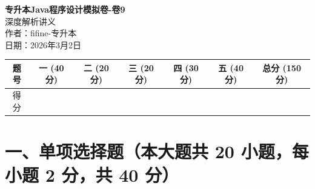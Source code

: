\documentclass[12pt, a4paper]{ctexart}
\begin{document}
\thispagestyle{empty}
\newpage

\begin{center}
	{\huge\bfseries\color{myblue} 专升本Java程序设计模拟卷-卷9}\\[1em]
	{\large 深度解析讲义}\\[1em]
	{\large 作者：fifine-专升本}\\[1em]
	{\large 日期：2026年3月2日}\\[1em]
	\vspace{1em}
	\begin{tabular}{|c|c|c|c|c|c|c|}
		\hline
		题号 & 一 (40 分)       & 二 (20 分)       & 三 (20 分)       & 四 (30 分)       & 五 (40 分)       & 总分 (150 分)     \\
		\hline
		得分 & \hspace{1.5cm} & \hspace{1.5cm} & \hspace{1.5cm} & \hspace{1.5cm} & \hspace{1.5cm} & \hspace{1.5cm} \\
		\hline
	\end{tabular}
	\vspace{2em}
\end{center}

\section*{一、单项选择题（本大题共 20 小题，每小题 2 分，共 40 分）}
\end{document}

